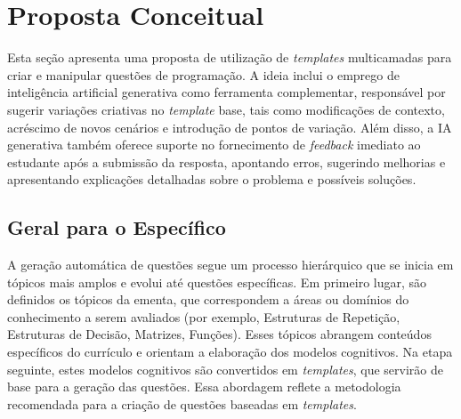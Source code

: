 \chapter{Proposta Conceitual}

Esta seção apresenta uma proposta de utilização de \textit{templates} multicamadas para criar e manipular questões de programação. A ideia inclui o emprego de inteligência artificial generativa como ferramenta complementar, responsável por sugerir variações criativas no \textit{template} base, tais como modificações de contexto, acréscimo de novos cenários e introdução de pontos de variação. Além disso, a IA generativa também oferece suporte no fornecimento de \textit{feedback} imediato ao estudante após a submissão da resposta, apontando erros, sugerindo melhorias e apresentando explicações detalhadas sobre o problema e possíveis soluções. 

\section{Geral para o Específico}
A geração automática de questões segue um processo hierárquico que se inicia em tópicos mais amplos e evolui até questões específicas. Em primeiro lugar, são definidos os tópicos da ementa, que correspondem a áreas ou domínios do conhecimento a serem avaliados (por exemplo, Estruturas de Repetição, Estruturas de Decisão, Matrizes, Funções). Esses tópicos abrangem conteúdos específicos do currículo e orientam a elaboração dos modelos cognitivos. Na etapa seguinte, estes modelos cognitivos são convertidos em \textit{templates}, que servirão de base para a geração das questões. Essa abordagem reflete a metodologia recomendada para a criação de questões baseadas em \textit{templates}. 

